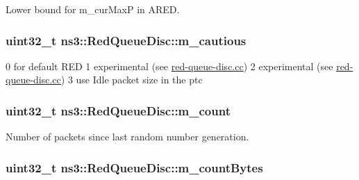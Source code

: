 Lower bound for m\+\_\+cur\+MaxP in A\+R\+ED. 

\subsubsection[{\texorpdfstring{m\+\_\+cautious}{m_cautious}}]{\setlength{\rightskip}{0pt plus 5cm}uint32\+\_\+t ns3\+::\+Red\+Queue\+Disc\+::m\+\_\+cautious\hspace{0.3cm}{\ttfamily [private]}}\hypertarget{classns3_1_1RedQueueDisc_a2156a26538fe0259220ca9e57c829c34}{}\label{classns3_1_1RedQueueDisc_a2156a26538fe0259220ca9e57c829c34}
0 for default R\+ED 1 experimental (see \hyperlink{red-queue-disc_8cc}{red-\/queue-\/disc.\+cc}) 2 experimental (see \hyperlink{red-queue-disc_8cc}{red-\/queue-\/disc.\+cc}) 3 use Idle packet size in the ptc 
\subsubsection[{\texorpdfstring{m\+\_\+count}{m_count}}]{\setlength{\rightskip}{0pt plus 5cm}uint32\+\_\+t ns3\+::\+Red\+Queue\+Disc\+::m\+\_\+count\hspace{0.3cm}{\ttfamily [private]}}\hypertarget{classns3_1_1RedQueueDisc_ac096c7624d6d921f4612e6e1852193f7}{}\label{classns3_1_1RedQueueDisc_ac096c7624d6d921f4612e6e1852193f7}


Number of packets since last random number generation. 

\subsubsection[{\texorpdfstring{m\+\_\+count\+Bytes}{m_countBytes}}]{\setlength{\rightskip}{0pt plus 5cm}uint32\+\_\+t ns3\+::\+Red\+Queue\+Disc\+::m\+\_\+count\+Bytes\hspace{0.3cm}{\ttfamily [private]}}\hypertarget{classns3_1_1RedQueueDisc_a7bcb375212b9757440dd9cf3e8f1ab5b}{}\label{classns3_1_1RedQueueDisc_a7bcb375212b9757440dd9cf3e8f1ab5b}


